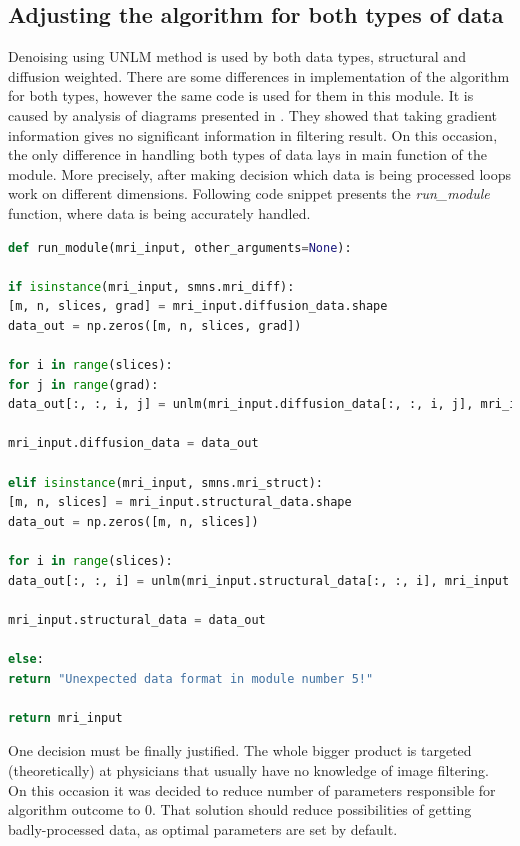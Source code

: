 \subsection*{Adjusting the algorithm for both types of data}
Denoising using UNLM method is used by both data types, structural and diffusion weighted. There are some differences in implementation of the algorithm for both types, however the same code is used for them in this module. It is caused by analysis of diagrams presented in \cite{5a2}. They showed that taking gradient information gives no significant information in filtering result. On this occasion, the only difference in handling both types of data lays in main function of the module. More precisely, after making decision which data is being processed loops work on different dimensions. Following code snippet presents the \textit{run\_module} function, where data is being accurately handled.

\begin{lstlisting}[language=Python, caption = run\_module function.]
def run_module(mri_input, other_arguments=None):

if isinstance(mri_input, smns.mri_diff):
[m, n, slices, grad] = mri_input.diffusion_data.shape
data_out = np.zeros([m, n, slices, grad])

for i in range(slices):
for j in range(grad):
data_out[:, :, i, j] = unlm(mri_input.diffusion_data[:, :, i, j], mri_input.noise_map[:, :, i, j])

mri_input.diffusion_data = data_out

elif isinstance(mri_input, smns.mri_struct):
[m, n, slices] = mri_input.structural_data.shape
data_out = np.zeros([m, n, slices])

for i in range(slices):
data_out[:, :, i] = unlm(mri_input.structural_data[:, :, i], mri_input.noise_map[:, :, i])

mri_input.structural_data = data_out

else:
return "Unexpected data format in module number 5!"

return mri_input
\end{lstlisting}

One decision must be finally justified. The whole bigger product is targeted (theoretically) at physicians that usually have no knowledge of image filtering. On this occasion it was decided to reduce number of parameters responsible for algorithm outcome to 0. That solution should reduce possibilities of getting badly-processed data, as optimal parameters are set by default.
